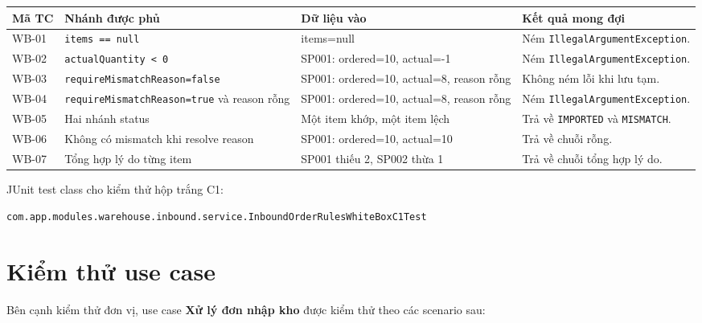 \documentclass[12pt,a4paper]{article}
\begin{document}
\begin{longtable}{|p{1.4cm}|p{4.2cm}|p{4.6cm}|p{4cm}|}
\hline
\textbf{Mã TC} & \textbf{Nhánh được phủ} & \textbf{Dữ liệu vào} & \textbf{Kết quả mong đợi} \\
\hline
WB-01 & \texttt{items == null} & items=null & Ném \texttt{IllegalArgumentException}. \\
\hline
WB-02 & \texttt{actualQuantity < 0} & SP001: ordered=10, actual=-1 & Ném \texttt{IllegalArgumentException}. \\
\hline
WB-03 & \texttt{requireMismatchReason=false} & SP001: ordered=10, actual=8, reason rỗng & Không ném lỗi khi lưu tạm. \\
\hline
WB-04 & \texttt{requireMismatchReason=true} và reason rỗng & SP001: ordered=10, actual=8, reason rỗng & Ném \texttt{IllegalArgumentException}. \\
\hline
WB-05 & Hai nhánh status & Một item khớp, một item lệch & Trả về \texttt{IMPORTED} và \texttt{MISMATCH}. \\
\hline
WB-06 & Không có mismatch khi resolve reason & SP001: ordered=10, actual=10 & Trả về chuỗi rỗng. \\
\hline
WB-07 & Tổng hợp lý do từng item & SP001 thiếu 2, SP002 thừa 1 & Trả về chuỗi tổng hợp lý do. \\
\hline
\end{longtable}

JUnit test class cho kiểm thử hộp trắng C1:

\begin{center}
\texttt{com.app.modules.warehouse.inbound.service.InboundOrderRulesWhiteBoxC1Test}
\end{center}

\section{Kiểm thử use case}

Bên cạnh kiểm thử đơn vị, use case \textbf{Xử lý đơn nhập kho} được kiểm thử theo các scenario sau:
\end{document}
